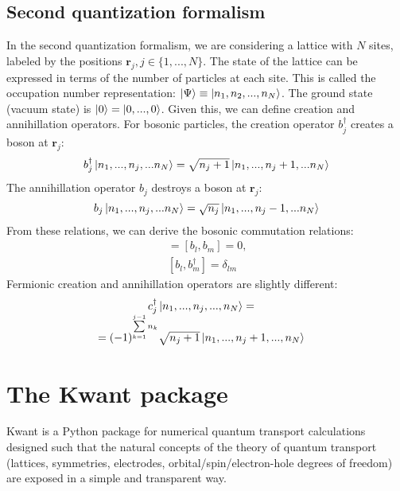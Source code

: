 \documentclass[11pt, a4paper, twocolumn]{article}
\newcommand{\bb}[1]{\mathbf{#1}}
\begin{document}
\subsection*{Second quantization formalism}
In the second quantization formalism, we are considering a lattice with $N$ sites, labeled by the positions
$\bb r_j, j \in \{1,...,N\}$. The state of the lattice can be expressed in terms of the number of particles at each site.
This is called the occupation number representation: $\ket\Psi\equiv \ket{n_1,n_2,...,n_N}$. The ground state (vacuum state) is
$\ket 0 = \ket{0,...,0}$. Given this, we can define creation and annihillation operators. For bosonic particles, the creation
operator $b^\dagger_j$ creates a boson at $\bb r_j$:
\begin{equation*}
  b^\dagger_j\ket{n_1,...,n_j,...n_N} = \sqrt{n_j+1}\ket{n_1,...,n_j+1,...n_N}
\end{equation*}
The annihillation operator $b_j$ destroys a boson at $\bb r_j$:
\begin{equation*}
  b_j\ket{n_1,...,n_j,...n_N} = \sqrt{n_j}\ket{n_1,...,n_j-1,...n_N}
\end{equation*}
From these relations, we can derive the bosonic commutation relations:
\begin{align*}
  [b^\dagger_l, b^\dagger_m] = [b_l,b_m]=0 \textrm{,} \\
  [b_l, b^\dagger_m] = \delta_{lm}
\end{align*}
Fermionic creation and annihillation operators are slightly different:
\begin{equation*}
  \begin{array}{cc}
    c^\dagger_j\ket{n_1,...,n_j,...,n_N} = &  \\
    = (-1)^{\sum\limits_{k=1}^{j-1} n_k}\sqrt{n_j+1}\ket{n_1,...,n_j+1,...,n_N} &
  \end{array}
\end{equation*}

\section*{The Kwant package}
Kwant is a Python package for numerical quantum transport calculations \cite{kwant-paper} 
designed such that the natural concepts of the theory of quantum transport (lattices, symmetries,
electrodes, orbital/spin/electron-hole degrees of freedom) are exposed in a simple and transparent way.
\end{document}
